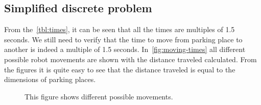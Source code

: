 \subsection{Simplified discrete problem}
From the~\autoref{tbl:times}, it can be seen that all the times are multiples
of 1.5 seconds. We still need to verify that the time to move from parking
place to another is indeed a multiple of 1.5 seconds.
In~\autoref{fig:moving-times} all different possible robot movements are shown
with the distance traveled calculated. From the figures it is quite easy to see
that the distance traveled is equal to the dimensions of parking places.

\begin{figure}[h]
    
    \caption{This figure shows different possible movements. }
    \label{fig:moving-times}
\end{figure}
\label{sec:discrete problem}

